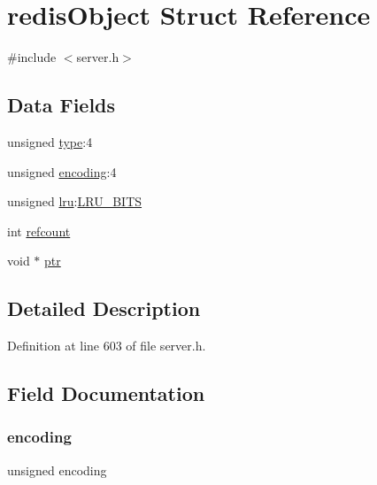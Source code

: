 \hypertarget{structredis_object}{}\section{redis\+Object Struct Reference}
\label{structredis_object}


{\ttfamily \#include $<$server.\+h$>$}

\subsection*{Data Fields}
\begin{DoxyCompactItemize}
\item 
unsigned \hyperlink{structredis_object_afa65f328561a1fb0d243d9be5d7f37dd}{type}\+:4
\item 
unsigned \hyperlink{structredis_object_adecc103e438ee35843ae312812d974a0}{encoding}\+:4
\item 
unsigned \hyperlink{structredis_object_abe5aec51795e89d8bdaf84d58d8eb00a}{lru}\+:\hyperlink{server_8h_ae839804d2b5fd0b2a83eb05e820079f3}{L\+R\+U\+\_\+\+B\+I\+TS}
\item 
int \hyperlink{structredis_object_a6022c8a609170c7365fb96e83cb2df48}{refcount}
\item 
void $\ast$ \hyperlink{structredis_object_add9af9569af79ec26dd741fb226b38ba}{ptr}
\end{DoxyCompactItemize}


\subsection{Detailed Description}


Definition at line 603 of file server.\+h.



\subsection{Field Documentation}
\mbox{\label{structredis_object_adecc103e438ee35843ae312812d974a0}} 
\subsubsection{\texorpdfstring{encoding}{encoding}}
{\footnotesize\ttfamily unsigned encoding}



